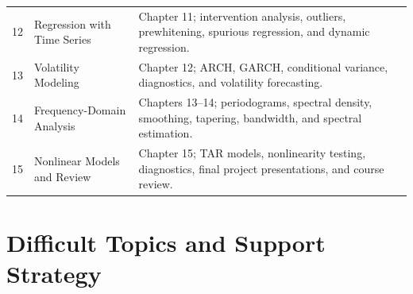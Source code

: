 \documentclass[11pt]{article}
\begin{document}
\begin{longtable}{p{} p{} p{}}
12 & Regression with Time Series & Chapter 11; intervention analysis, outliers, prewhitening, spurious regression, and dynamic regression. \\

13 & Volatility Modeling & Chapter 12; ARCH, GARCH, conditional variance, diagnostics, and volatility forecasting. \\

14 & Frequency-Domain Analysis & Chapters 13--14; periodograms, spectral density, smoothing, tapering, bandwidth, and spectral estimation. \\

15 & Nonlinear Models and Review & Chapter 15; TAR models, nonlinearity testing, diagnostics, final project presentations, and course review. \\

\bottomrule
\end{longtable}

\section{Difficult Topics and Support Strategy}
\end{document}
